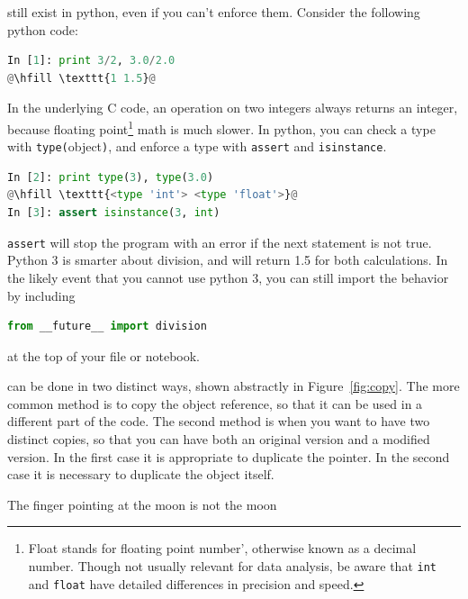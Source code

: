 \documentclass[justified]{tufte-handout}
\newcommand{\floatNote}{\footnote{ Float stands for floating
  point number', otherwise known as a decimal number. Though not usually
  relevant for data analysis, be aware that \texttt{int} and \texttt{float} have
  detailed differences in precision and speed.}}
\begin{document}
 still exist in python, even if you can't enforce
them. Consider the following python code:
\begin{adjustwidth}{2.5em}{0pt}
\begin{lstlisting}[language=Python]
In [1]: print 3/2, 3.0/2.0
@\hfill \texttt{1 1.5}@
\end{lstlisting}
\end{adjustwidth}

\noindent
In the underlying C code, an operation on two integers always returns an
integer, because floating point\floatNote{} \;math is much slower. In python,
you can check a type with \lstinline !type(!object\lstinline !)!, and enforce a
type with \lstinline !assert! and \lstinline !isinstance!.
\begin{adjustwidth}{2.5em}{0pt}
\begin{lstlisting}[language=Python]
In [2]: print type(3), type(3.0)
@\hfill \texttt{<type 'int'> <type 'float'>}@
In [3]: assert isinstance(3, int)
\end{lstlisting}
\end{adjustwidth}
\lstinline !assert! will stop the program with an error if the next statement is
not true. Python 3 is smarter about division, and will return 1.5 for both
calculations. In the likely event that you cannot use python 3, you can still
import the behavior by including
\begin{adjustwidth}{2.5em}{0pt}
\begin{lstlisting}[language=Python]
from __future__ import division
\end{lstlisting}
\end{adjustwidth}
at the top of your file or notebook.

 can be done in two distinct ways, shown abstractly
in Figure~\ref*{fig:copy}. The more common method is to copy the object
reference, so that it can be used in a different part of the code. The second
method is when you want to have two distinct copies, so that you can have both
an original version and a modified version. In the first case it is appropriate
to duplicate the pointer. In the second case it is necessary to duplicate the
object itself.


\smallskip
\begin{marginfigure}
    \vspace*{\fill}
    \centering
    \subfloat[Case 1]{\scalebox{1}{}}

    \vfill

    \subfloat[Case 2]{\scalebox{0.69}{}}
  \caption{The finger pointing at the moon is not the moon}
\label{fig:copy}
\end{marginfigure}
\end{document}

